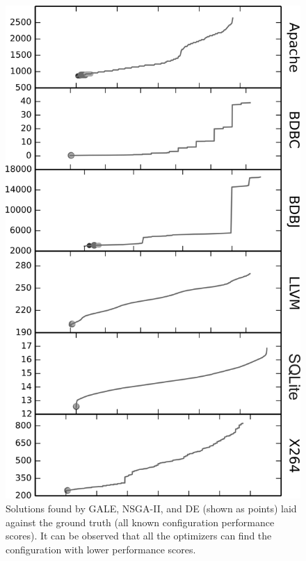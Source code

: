 \begin{figure}[tb]
\centering
\includegraphics[width=\columnwidth]{Figures/optimizer_result}
\caption{Solutions found by GALE, NSGA-II, and DE (shown as points) laid against the ground truth (all known configuration performance scores). 
It can be observed that all the optimizers can find the configuration with  lower performance scores.}\label{fig:performance_graph}
\end{figure}


